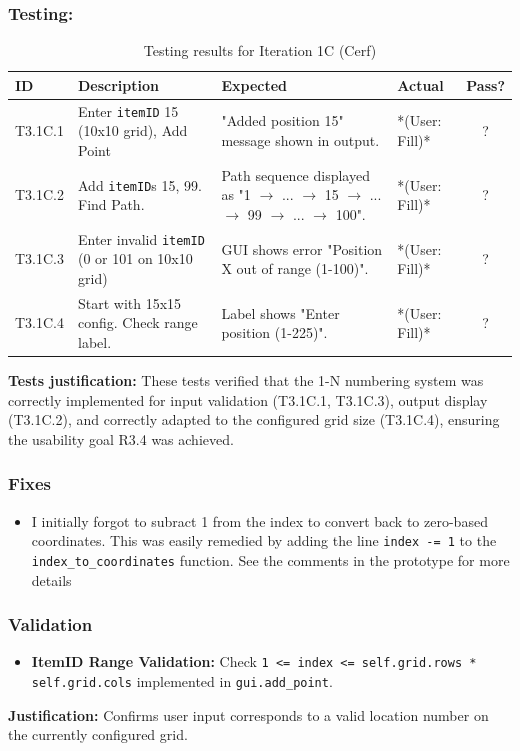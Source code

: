 \subsubsection{Testing:}
\begin{table}[htbp]
	\centering
	\begin{tabularx}{\textwidth}{|l|X|p{4.5cm}|p{1.5cm}|c|}
		\hline
		\textbf{ID} & \textbf{Description} & \textbf{Expected} & \textbf{Actual} & \textbf{Pass?} \\
		\hline
		T3.1C.1 & Enter \verb|itemID| 15 (10x10 grid), Add Point & "Added position 15" message shown in output. & *(User: Fill)* & ? \\
		\hline
		T3.1C.2 & Add \verb|itemID|s 15, 99. Find Path. & Path sequence displayed as "1 $ \rightarrow $ ... $ \rightarrow $ 15 $ \rightarrow $ ... $ \rightarrow $ 99 $ \rightarrow $ ... $ \rightarrow $ 100". & *(User: Fill)* & ? \\
		\hline
		T3.1C.3 & Enter invalid \verb|itemID| (0 or 101 on 10x10 grid) & GUI shows error "Position X out of range (1-100)". & *(User: Fill)* & ? \\
		\hline
		T3.1C.4 & Start with 15x15 config. Check range label. & Label shows "Enter position (1-225)". & *(User: Fill)* & ? \\
		\hline
	\end{tabularx}
	\caption{Testing results for Iteration 1C (Cerf)}
\end{table}
\textbf{Tests justification:} These tests verified that the 1-N numbering system was correctly implemented for input validation (T3.1C.1, T3.1C.3), output display (T3.1C.2), and correctly adapted to the configured grid size (T3.1C.4), ensuring the usability goal R3.4 was achieved.

\subsubsection{Fixes}
\begin{itemize}
	\item I initially forgot to subract 1 from the index to convert back to zero-based coordinates. This was easily remedied by adding the line \verb|index -= 1| to the \verb*|index_to_coordinates| function. See the comments in the prototype for more details
\end{itemize}

\subsubsection{Validation}
\begin{itemize}
	\item \textbf{ItemID Range Validation:} Check \verb|1 <= index <= self.grid.rows * self.grid.cols| implemented in \verb|gui.add_point|.
\end{itemize}
\textbf{Justification:} Confirms user input corresponds to a valid location number on the currently configured grid.



